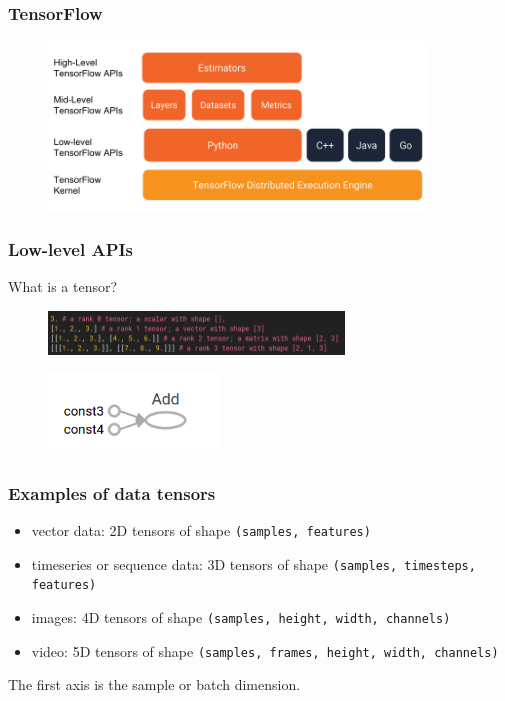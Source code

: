 \begin{frame}
        \frametitle{TensorFlow}

        \begin{figure}
                \includegraphics[width=0.9\textwidth]{Pics/tf_api.png}
        \end{figure}

\end{frame}

\begin{frame}
        \frametitle{Low-level APIs}

	What is a tensor?

        \begin{figure}
                \includegraphics[width=0.7\textwidth]{Pics/tensor.png}
        \end{figure}

	\begin{figure}
                \includegraphics[width=0.4\textwidth]{Pics/graph.png}
        \end{figure}

\end{frame}

\begin{frame}
	\frametitle{Examples of data tensors}

	\begin{itemize}
		\item vector data: 2D tensors of shape \texttt{(samples, features)}
		\item timeseries or sequence data: 3D tensors of shape \texttt{(samples, timesteps, features)}
		\item images: 4D tensors of shape \texttt{(samples, height, width, channels)}
		\item video: 5D tensors of shape \texttt{(samples, frames, height, width, channels)}
	\end{itemize}

	\small{The first axis is the sample or batch dimension.}

\end{frame}

